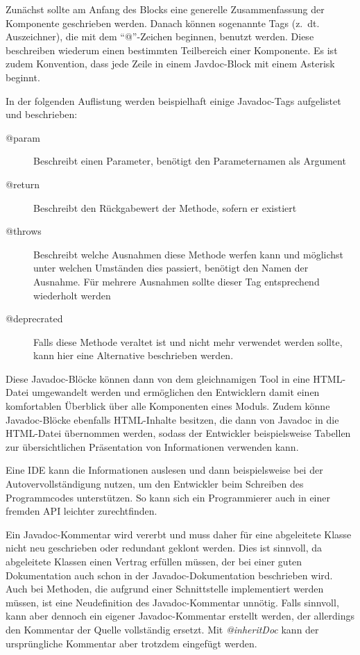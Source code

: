 		
		
Zunächst sollte am Anfang des Blocks eine generelle Zusammenfassung der Komponente geschrieben werden. Danach können sogenannte Tags (z.~dt. Auszeichner), die mit dem \enquote{@}-Zeichen beginnen, benutzt werden. Diese beschreiben wiederum einen bestimmten Teilbereich einer Komponente. Es ist zudem Konvention, dass jede Zeile in einem Javdoc-Block mit einem Asterisk beginnt. 

In der folgenden Auflistung werden beispielhaft einige Javadoc-Tags aufgelistet und beschrieben:
\begin{description}
         \item[@param]  Beschreibt einen Parameter, benötigt den Parameternamen als Argument
         \item[@return]  Beschreibt den Rückgabewert der Methode, sofern er existiert 
         \item[@throws] Beschreibt welche Ausnahmen diese Methode werfen kann und möglichst unter welchen Umständen dies passiert, benötigt den Namen der Ausnahme. Für mehrere Ausnahmen sollte dieser Tag entsprechend wiederholt werden 
         \item[@deprecrated] Falls diese Methode veraltet ist und nicht mehr verwendet werden sollte, kann hier eine Alternative beschrieben werden. 
        
\end{description}



Diese Javadoc-Blöcke können dann von dem gleichnamigen Tool in eine HTML-Datei umgewandelt werden und ermöglichen den Entwicklern damit einen komfortablen Überblick über alle Komponenten eines Moduls. Zudem könne Javadoc-Blöcke ebenfalls HTML-Inhalte besitzen, die dann von Javadoc in die HTML-Datei übernommen werden, sodass der Entwickler beispielsweise Tabellen zur übersichtlichen Präsentation  von Informationen verwenden kann. 

Eine \ac{IDE} kann die Informationen auslesen und dann beispielsweise bei der Autovervollständigung nutzen, um den Entwickler beim Schreiben des Programmcodes unterstützen. So kann sich ein Programmierer auch in einer fremden \ac{API} leichter zurechtfinden.

Ein Javadoc-Kommentar wird vererbt und muss daher für eine abgeleitete Klasse nicht neu geschrieben oder redundant geklont werden. Dies ist sinnvoll, da abgeleitete Klassen einen Vertrag erfüllen müssen, der bei einer guten Dokumentation auch schon in der Javadoc-Dokumentation beschrieben wird. Auch bei Methoden, die aufgrund einer Schnittstelle implementiert werden müssen, ist eine Neudefinition des Javadoc-Kommentar unnötig. Falls sinnvoll, kann aber dennoch ein eigener Javadoc-Kommentar erstellt werden, der allerdings den Kommentar der Quelle vollständig ersetzt. Mit \textit{@inheritDoc} kann der ursprüngliche Kommentar aber trotzdem eingefügt werden.

